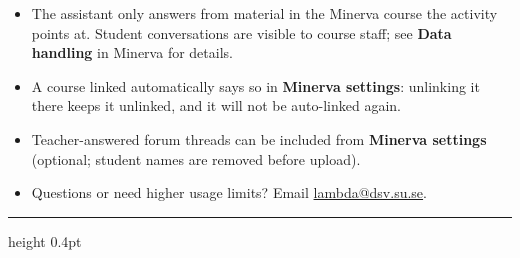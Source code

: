\documentclass[11pt]{article}
\begin{document}
\begin{itemize}[leftmargin=1.4em,itemsep=4pt]
  \item The assistant only answers from material in the Minerva course the
  activity points at. Student conversations are visible to course staff; see
  \textbf{Data handling} in Minerva for details.
  \item A course linked automatically says so in \textbf{Minerva settings}:
  unlinking it there keeps it unlinked, and it will not be auto-linked again.
  \item Teacher-answered forum threads can be included from \textbf{Minerva
  settings} (optional; student names are removed before upload).
  \item Questions or need higher usage limits? Email
  \href{mailto:lambda@dsv.su.se}{lambda@dsv.su.se}.
\end{itemize}

\vspace{1.2em}
\hrule height 0.4pt
\vspace{0.4em}
\end{document}
